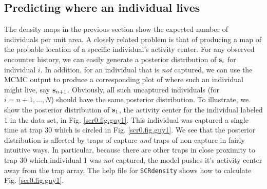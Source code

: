 {


\subsection{Predicting  where an individual lives}

The density maps in the previous section show the expected number of
individuals per unit area.  A closely related problem is that of
producing a map of the probable location of a specific individual's
activity center. 
For any observed encounter history, we can easily generate a posterior
distribution of ${\bf s}_{i}$ for individual $i$.
In addition, for an individual that is {\it not} captured, we can use
the MCMC output to produce a corresponding plot of where such an
individual might live, say ${\bf s}_{n+1}$.   Obviously, all such
uncaptured individuals (for $i=n+1,\ldots,N$) should have the same posterior distribution.
To illustrate,
 we show the posterior distribution of ${\bf s}_{1}$, the
activity center for the individual labeled 1 in the data set, in Fig. \ref{scr0.fig.guy1}. This
individual was captured a single time at trap 30 which is circled in
Fig. \ref{scr0.fig.guy1}.  We see that 
the posterior distribution is affected by 
 traps of capture {\it and} traps of
non-capture in fairly intuitive ways.  In particular, because there
are other traps in close proximity to trap 30 which individual 1 was
{\it not} captured, the model pushes  it's activity center away from
the trap array.
The help file for \mbox{\tt SCRdensity} shows how to calculate Fig. \ref{scr0.fig.guy1}.


}
